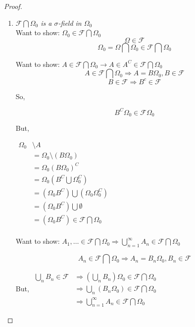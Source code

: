 \documentclass[11pt,fleqn]{book} %
\begin{document}
\begin{proof}
	\begin{enumerate}[label = (\roman*)]
		\item \textit{$\mathcal{F} \bigcap \Omega_0$ is a $\sigma$-field in $\Omega_0$}\\

			Want to show: $\Omega_0 \in \mathcal{F} \bigcap \Omega_0$\\

				$$\Omega \in \mathcal{F} $$
				$$\Omega_0 = \Omega \bigcap \Omega_0 \in \mathcal{F} \bigcap \Omega_0 $$

			Want to show: $A \in \mathcal{F} \bigcap \Omega_0 \rightarrow A \in A^C \in \mathcal{F} \bigcap \Omega_0$ \\

				$$A \in \mathcal{F} \bigcap \Omega_0 \Rightarrow A = B\Omega_0, B \in \mathcal{F} $$
				$$B \in \mathcal{F} \Rightarrow B^c \in \mathcal{F} $$

				So, 

				$$B^C \Omega_0 \in \mathcal{F} \Omega_0$$

				But, 

				$\begin{aligned}
							\Omega_0 &\setminus A	\\
							&= 	\Omega_0 \setminus (B\Omega_0)\\
							&= 	\Omega_0 (B\Omega_0)^C\\
							&= 	\Omega_0 (B^C \bigcup \Omega_0^C)\\
							&= 	(\Omega_0B^C) \bigcup (\Omega_0\Omega_0^C)\\
							&= (\Omega_0B^C) \bigcup \emptyset \\
							&= (\Omega_0B^C) \in \mathcal{F}\bigcap \Omega_0
				\end{aligned}$\\
				\\
					
		Want to show: $A_1, \dots \in \mathcal{F} \bigcap \Omega_0 \Rightarrow \bigcup^\infty_{n=1} A_n \in \mathcal{F} \bigcap \Omega_0 $

			$$A_n \in \mathcal{F} \bigcap \Omega_0 \Rightarrow A_n = B_n \Omega_0, B_n \in \mathcal{F} $$

			But, 
				$\begin{aligned}
					\bigcup_n B_n \in \mathcal{F} &\Rightarrow (\bigcup_n B_n)\Omega_0 \in \mathcal{F} \bigcap \Omega_0\\
					&\Rightarrow \bigcup_n (B_n\Omega_0) \in \mathcal{F} \bigcap \Omega_0\\
					&\Rightarrow \bigcup^\infty_{n=1} A_n \in \mathcal{F} \bigcap \Omega_0 
				\end{aligned} $


\end{enumerate}
\end{proof}
\end{document}
